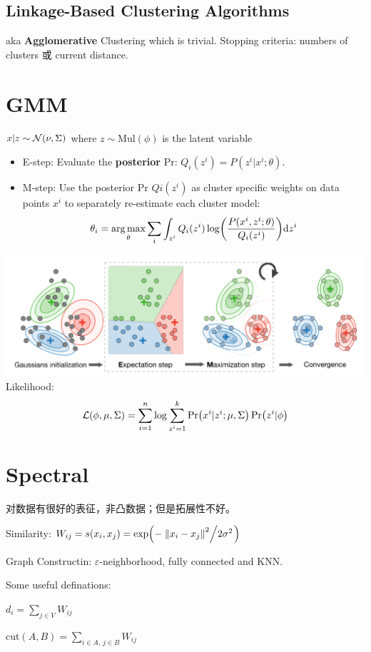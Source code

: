 \documentclass[a4paper,landscape]{article}
\begin{document}
\begin{tiny}
\begin{multicols}{4}
		\subsection{Linkage-Based Clustering Algorithms} aka \textbf{Agglomerative} Clustering which is trivial. Stopping criteria: numbers of clusters 或 current distance.

		\section{GMM}
		$x|z\sim\mathcal{N}(\nu,\Sigma)$ where  $z\sim \mathrm{Mul}(\phi)$ is the latent variable
		\begin{itemize}
			\item
			      E-step: Evaluate the \textbf{posterior} Pr:
			      $Q_i(z^i)=P(z^i|x^i;\theta)$.
			\item
			      M-step: Use the posterior Pr $Qi(z^i)$ as cluster specific weights on data points $x^i$ to separately re-estimate each cluster model:
			      \[
				      \theta_i
				      =
				      \mathop{\arg\max}_\theta \sum_i \int_{z^i}
				      Q_i(z^i)\log(\frac{P(x^i,z^i;\theta)}{Q_i(z^i)}) \dd z^i
			      \]
		\end{itemize}
		\includegraphics[width=\linewidth]{EM.png}
		Likelihood:
		\[\mathcal{L}(\phi,\mu,\Sigma)=\sum_{i=1}^n\log\sum_{z^i=1}^k\Pr(x^i|z^i;\mu,\Sigma)\Pr(z^i|\phi)\]

		\section{Spectral}
		对数据有很好的表征，非凸数据；但是拓展性不好。

		Similarity: $W_{ij}=s(x_i,x_j)=\exp(-\flatfrac{\norm{x_i-x_j}^2}{2\sigma^2})$

		Graph Constructin: $\varepsilon$-neighborhood, fully connected and KNN.
		\begin{defi}
			Some useful definations:

			$d_i=\sum_{j\in V}W_{ij}$

			$\mathrm{cut}(A,B)=\sum_{i\in A,\,j\in B}W_{ij}$


\end{defi}
\end{multicols}
\end{tiny}
\end{document}

